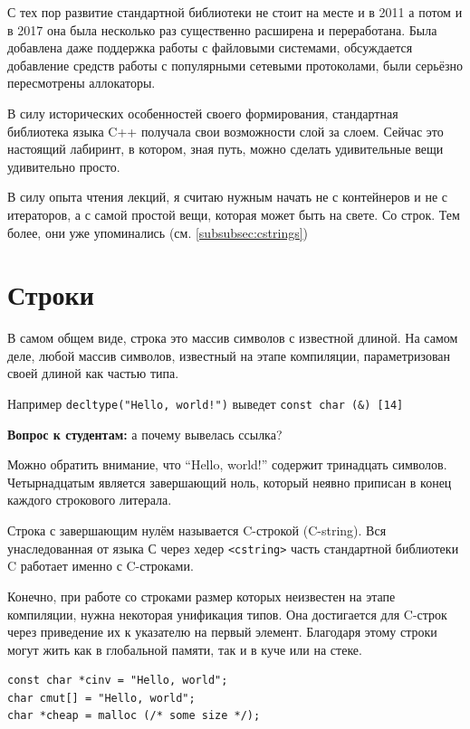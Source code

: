 \documentclass[a4paper,12pt,oneside]{book}
\newif\ifanswers
\begin{document}
С тех пор развитие стандартной библиотеки не стоит на месте и в 2011 а потом и в 2017 она была несколько раз существенно расширена и переработана. Была добавлена даже поддержка работы с файловыми системами, обсуждается добавление средств работы с популярными сетевыми протоколами, были серьёзно пересмотрены аллокаторы.

В силу исторических особенностей своего формирования, стандартная библиотека языка C++ получала свои возможности слой за слоем. Сейчас это настоящий лабиринт, в котором, зная путь, можно сделать удивительные вещи удивительно просто.

В силу опыта чтения лекций, я считаю нужным начать не с контейнеров и не с итераторов, а с самой простой вещи, которая может быть на свете. Со строк. Тем более, они уже упоминались (см. \ref{subsubsec:cstrings})

\pagebreak
\section{Строки}\label{subsec:strings}

В самом общем виде, строка это массив символов с известной длиной. На самом деле, любой массив символов, известный на этапе компиляции, параметризован своей длиной как частью типа.

Например \lstinline?decltype("Hello, world!")? выведет \lstinline!const char (&) [14]!

\textbf{Вопрос к студентам:} а почему вывелась ссылка?

\ifanswers
Правильный ответ: массив это всегда lvalue, а для lvalue вывод decltype приписывает левую ссылку
\fi

Можно обратить внимание, что ``Hello, world!'' содержит тринадцать символов. Четырнадцатым является завершающий ноль, который неявно приписан в конец каждого строкового литерала.

Строка с завершающим нулём называется C-строкой (C-string). Вся унаследованная от языка С через хедер \lstinline!<cstring>! часть стандартной библиотеки C работает именно с C-строками.

Конечно, при работе со строками размер которых неизвестен на этапе компиляции, нужна некоторая унификация типов. Она достигается для C-строк через приведение их к указателю на первый элемент. Благодаря этому строки могут жить как в глобальной памяти, так и в куче или на стеке.

\begin{lstlisting}
const char *cinv = "Hello, world";
char cmut[] = "Hello, world";
char *cheap = malloc (/* some size */);
\end{lstlisting}
\end{document}
